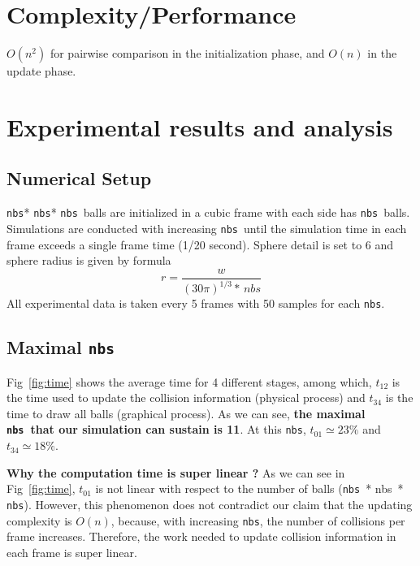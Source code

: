 \documentclass[twoside,11pt]{article}
\newcommand{\nbs}{\texttt{nbs}}
\begin{document}
\section{Complexity/Performance}
$O(n^2)$ for pairwise comparison in the initialization phase, and $O(n)$ in the update phase.


\section{Experimental results and analysis}

\subsection{Numerical Setup}
\nbs * \nbs * \nbs\ balls are initialized in a cubic 
frame with each side has \nbs\ balls. Simulations are conducted 
with increasing \nbs\ until the simulation time in each frame exceeds
a single frame time (1/20 second). Sphere detail is set to 6 and 
sphere radius is given by formula
\[
  r = \frac{w}{(30\pi)^{1/3} *\, nbs}
\] 
All experimental data is taken every 5 frames with 50 samples
for each \nbs.

\subsection{Maximal \nbs}
Fig~\ref{fig:time} shows the average time for 4 different stages, among
which, $t_{12}$ is the time used to update the collision information 
(physical process) and $t_{34}$ is the time to draw all balls (graphical
process). As we can see, \textbf{the maximal \nbs\ that our simulation can
sustain is 11}. At this \nbs, $t_{01}\simeq 23\%$ and $t_{34}\simeq 18\%$.

\textbf{Why the computation time is super linear ?} 
As we can see in Fig~\ref{fig:time},  $t_{01}$ is not linear with respect
to the number of balls (\nbs\ * nbs\ * \nbs). However, this phenomenon 
does not contradict 
our claim that the updating complexity is $O(n)$, because, with increasing
\nbs, the number of collisions per frame increases. Therefore, the work
needed to update collision information in each frame is super linear. 
\end{document}
